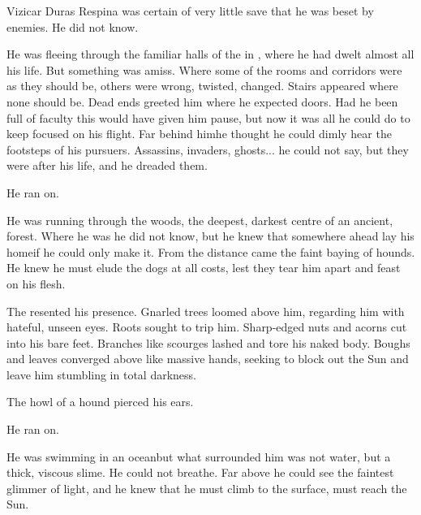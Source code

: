\begin{comment}
\section{Vizicar dreams}
\end{comment}

\new

Vizicar Duras Respina was certain of very little save that he was beset by enemies. 
He did not know. 

He was fleeing through the familiar halls of the  in , where he had dwelt almost all his life. But something was amiss. Where some of the rooms and corridors were as they should be, others were wrong, twisted, changed. Stairs appeared where none should be. Dead ends greeted him where he expected doors. Had he been full of faculty this would have given him pause, but now it was all he could do to keep focused on his flight. Far behind him\dash{}\dash he thought he could dimly hear the footsteps of his pursuers. Assassins, invaders, ghosts... he could not say, but they were after his life, and he dreaded them. 

He ran on.

He was running through the woods, the deepest, darkest centre of an ancient, \Wylde{} forest. Where he was he did not know, but he knew that somewhere ahead lay his home\dash if he could only make it. From the distance came the faint baying of hounds.  He knew he must elude the dogs at all costs, lest they tear him apart and feast on his flesh. 

The \Wylde{} resented his presence. Gnarled trees loomed above him, regarding him with hateful, unseen eyes. Roots sought to trip him. Sharp-edged nuts and acorns cut into his bare feet. Branches like scourges lashed and tore his naked body. Boughs and leaves converged above like massive hands, seeking to block out the Sun and leave him stumbling in total darkness. 

The howl of a hound pierced his ears. 

He ran on. 

He was swimming in an ocean\dash but what surrounded him was not water, but a thick, viscous slime. He could not breathe. Far above he could see the faintest glimmer of light, and he knew that he must climb to the surface, must reach the Sun. 

